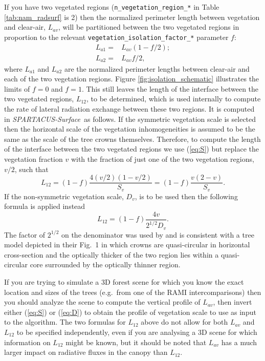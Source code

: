 \documentclass[a4,oneside]{article}
\def\codesize{\small}
\def\spsurf{\emph{SPARTACUS-Surface}}
\def\code#1{{\codesize\texttt{#1}}}
\begin{document}
If you have two vegetated regions (\code{n\_vegetation\_region\_*} in
Table \ref{tab:nam_radsurf} is 2) then the normalized perimeter length
between vegetation and clear-air, $L_{av}$, will be partitioned between the
two vegetated regions in proportion to the relevant
\code{vegetation\_isolation\_factor\_*} parameter $f$:
%
\begin{align}
L_{a1}=&L_{av}(1-f/2);\label{eq:La1}\\
L_{a2}=&L_{av}f/2,\label{eq:La2}
\end{align}
%
where $L_{a1}$ and $L_{a2}$ are the normalized perimeter lengths
between clear-air and each of the two vegetation regions.  Figure
\ref{fig:isolation_schematic} illustrates the limits of $f=0$ and
$f=1$.
%
This still leaves the length of the interface between the two
vegetated regions, $L_{12}$, to be determined, which is used
internally to compute the rate of lateral radiation exchange between
these two regions. It is computed in \spsurf\ as follows.  If the
symmetric vegetation scale is selected then the horizontal scale of
the vegetation inhomogeneities is assumed to be the same as the scale
of the tree crowns themselves. Therefore, to compute the length of the
interface between the two vegetated regions we use (\ref{eq:S}) but
replace the vegetation fraction $v$ with the fraction of just one of
the two vegetation regions, $v/2$, such that
%
\begin{equation}
L_{12}=(1-f)\frac{4(v/2)(1-v/2)}{S_v}=(1-f)\frac{v(2-v)}{S_v}.\label{eq:L12S}
\end{equation}
%
If the non-symmetric vegetation scale, $D_v$, is to be used then the
following formula is applied instead
%
\begin{equation}
L_{12}=(1-f)\frac{4v}{2^{1/2}D_v}.\label{eq:L12D}
\end{equation}
%
The factor of $2^{1/2}$ on the denominator was used by
\cite{Hogan+2018} and is consistent with a tree model depicted in
their Fig.\ 1 in which crowns are quasi-circular in horizontal
cross-section and the optically thicker of the two region lies within
a quasi-circular core surrounded by the optically thinner region.

If you are trying to simulate a 3D forest scene for which you know the
exact location and sizes of the trees (e.g.\ from one of the RAMI
intercomparisons) then you should analyze the scene to compute the
vertical profile of $L_{av}$, then invert either (\ref{eq:S}) or
(\ref{eq:D}) to obtain the profile of vegetation scale to use as input
to the algorithm. The two formulas for $L_{12}$ above do not allow for
both $L_{av}$ and $L_{12}$ to be specified independently, even if you are
analysing a 3D scene for which information on $L_{12}$ might be known,
but it should be noted that $L_{av}$ has a much larger impact on radiative
fluxes in the canopy than $L_{12}$.
\end{document}
